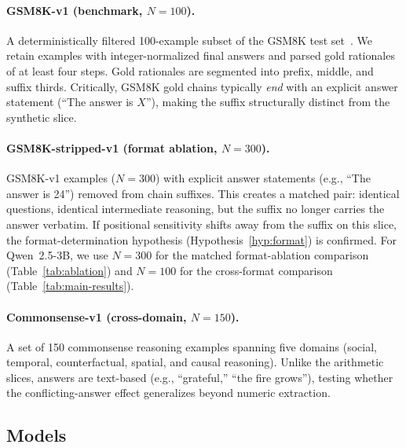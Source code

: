 \documentclass{article}
\theoremstyle{definition}
\theoremstyle{definition}
\begin{document}
\paragraph{GSM8K-v1 (benchmark, $N{=}100$).}
A deterministically filtered 100-example subset of the GSM8K test
set~\citep{cobbe2021}. We retain examples with integer-normalized final answers
and parsed gold rationales of at least four steps. Gold rationales
are segmented into prefix, middle, and suffix thirds. Critically, GSM8K gold
chains typically \emph{end} with an explicit answer statement (``The answer is
$X$''), making the suffix structurally distinct from the synthetic slice.

\paragraph{GSM8K-stripped-v1 (format ablation, $N{=}300$).}
GSM8K-v1 examples ($N{=}300$) with explicit answer statements
(e.g., ``The answer is 24'') removed from chain suffixes. This creates a
matched pair: identical questions, identical intermediate reasoning, but
the suffix no longer carries the answer verbatim. If positional sensitivity
shifts away from the suffix on this slice, the format-determination
hypothesis (Hypothesis~\ref{hyp:format}) is confirmed.
For Qwen~2.5-3B, we use $N{=}300$ for the matched format-ablation comparison
(Table~\ref{tab:ablation}) and $N{=}100$ for the cross-format comparison
(Table~\ref{tab:main-results}).

\paragraph{Commonsense-v1 (cross-domain, $N{=}150$).}
A set of 150 commonsense reasoning examples spanning five domains
(social, temporal, counterfactual, spatial, and causal reasoning).
Unlike the arithmetic slices, answers are text-based (e.g., ``grateful,''
``the fire grows''), testing whether the conflicting-answer effect
generalizes beyond numeric extraction.

\subsection{Models}
\label{sec:models}
\end{document}

